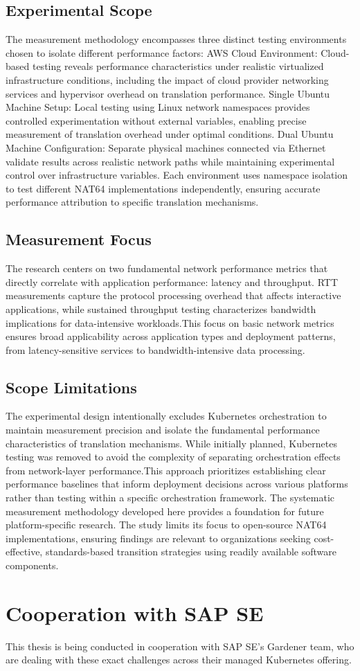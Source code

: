 \subsection{Experimental Scope}

The measurement methodology encompasses three distinct testing environments chosen to isolate different performance factors:
AWS Cloud Environment: Cloud-based testing reveals performance characteristics under realistic virtualized infrastructure conditions, including the impact of cloud provider networking services and hypervisor overhead on translation performance.
Single Ubuntu Machine Setup: Local testing using Linux network namespaces provides controlled experimentation without external variables, enabling precise measurement of translation overhead under optimal conditions.
Dual Ubuntu Machine Configuration: Separate physical machines connected via Ethernet validate results across realistic network paths while maintaining experimental control over infrastructure variables.
Each environment uses namespace isolation to test different NAT64 implementations independently, ensuring accurate performance attribution to specific translation mechanisms.

\subsection{Measurement Focus}

The research centers on two fundamental network performance metrics that directly correlate with application performance: latency and throughput. RTT measurements capture the protocol processing overhead that affects interactive applications, while sustained throughput testing characterizes bandwidth implications for data-intensive workloads.This focus on basic network metrics ensures broad applicability across application types and deployment patterns, from latency-sensitive services to bandwidth-intensive data processing.

\subsection{Scope Limitations}

The experimental design intentionally excludes Kubernetes orchestration to maintain measurement precision and isolate the fundamental performance characteristics of translation mechanisms. While initially planned, Kubernetes testing was removed to avoid the complexity of separating orchestration effects from network-layer performance.This approach prioritizes establishing clear performance baselines that inform deployment decisions across various platforms rather than testing within a specific orchestration framework. The systematic measurement methodology developed here provides a foundation for future platform-specific research. The study limits its focus to open-source NAT64 implementations, ensuring findings are relevant to organizations seeking cost-effective, standards-based transition strategies using readily available software components.

\section{Cooperation with SAP SE}
This thesis is being conducted in cooperation with SAP SE's Gardener team, who are dealing with these exact challenges across their managed Kubernetes offering.